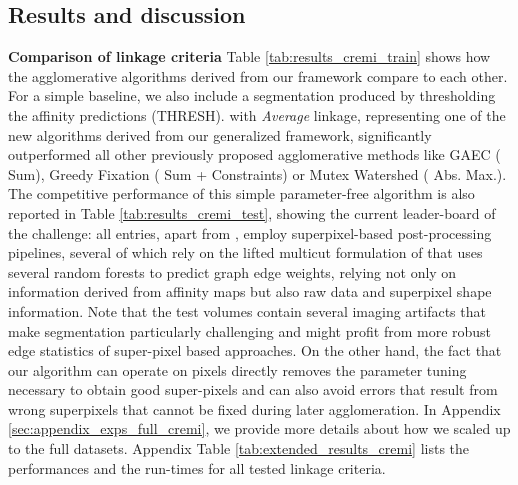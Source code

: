 
\subsection{Results and discussion}\label{sec:results}
\textbf{Comparison of linkage criteria} Table \ref{tab:results_cremi_train} shows how the agglomerative algorithms derived from our framework compare to each other. For a simple baseline, we also include a segmentation produced by thresholding the affinity predictions (THRESH).
\algname{} with \emph{Average} linkage, representing one of the new algorithms derived from our generalized framework, significantly outperformed all other previously proposed agglomerative methods like GAEC \cite{keuper2015efficient} (\algname{} Sum), Greedy Fixation \cite{levinkov2017comparative} (\algname{} Sum + Constraints) or Mutex Watershed \cite{wolf2018mutex} (\algname{} Abs. Max.). The competitive performance of this simple parameter-free algorithm is also reported in Table \ref{tab:results_cremi_test}, showing the current leader-board of the challenge: all entries, apart from \algname{}, employ superpixel-based post-processing pipelines, several of which rely on the lifted multicut formulation of \cite{beier2017multicut} that uses several random forests to predict graph edge weights, relying not only on information derived from affinity maps but also raw data and superpixel shape information.
Note that the test volumes contain several imaging artifacts that make segmentation particularly challenging and might profit from more robust edge statistics of super-pixel based approaches.
On the other hand, the fact that our algorithm can operate on pixels directly removes the parameter tuning necessary to obtain good super-pixels and can also avoid errors that result from wrong superpixels that cannot be fixed during later agglomeration.
In Appendix \ref{sec:appendix_exps_full_cremi}, we provide more details about how we scaled up \algname{} to the full datasets. Appendix Table \ref{tab:extended_results_cremi} lists the performances and the run-times for all tested \algname{} linkage criteria.\\





